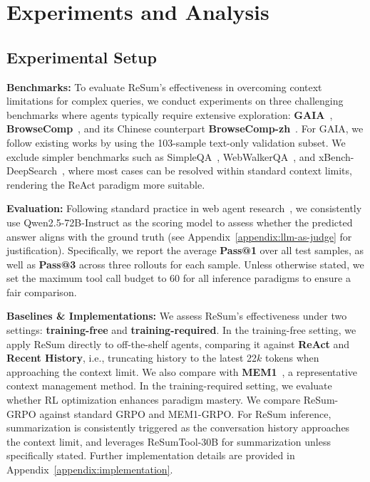 \section{Experiments and Analysis}

\subsection{Experimental Setup}
\textbf{Benchmarks:} To evaluate ReSum's effectiveness in overcoming context limitations for complex queries, we conduct experiments on three challenging benchmarks where agents typically require extensive exploration: \textbf{GAIA}~\citep{mialon2023gaia}, \textbf{BrowseComp}~\citep{bc_en}, and its Chinese counterpart \textbf{BrowseComp-zh}~\citep{bc_zh}. For GAIA, we follow existing works by using the 103-sample text-only validation subset. We exclude simpler benchmarks such as SimpleQA~\citep{wei2024simpleqa}, WebWalkerQA~\citep{wu2025webwalker}, and xBench-DeepSearch~\citep{xbench}, where most cases can be resolved within standard context limits, rendering the ReAct paradigm more suitable.

\textbf{Evaluation:} Following standard practice in web agent research~\citep{gao2025asearcher, dong2025arpo}, we consistently use Qwen2.5-72B-Instruct as the scoring model to assess whether the predicted answer aligns with the ground truth (see Appendix~\ref{appendix:llm-as-judge} for justification). Specifically, we report the average \textbf{Pass@1} over all test samples, as well as \textbf{Pass@3} across three rollouts for each sample. Unless otherwise stated, we set the maximum tool call budget to 60 for all inference paradigms to ensure a fair comparison.

\textbf{Baselines \& Implementations:} We assess ReSum's effectiveness under two settings: \textbf{training-free} and \textbf{training-required}. In the training-free setting, we apply ReSum directly to off-the-shelf agents, comparing it against \textbf{ReAct} and \textbf{Recent History}, i.e., truncating history to the latest 22$k$ tokens when approaching the context limit. We also compare with \textbf{MEM1}~\citep{zhou2025mem1}, a representative context management method. In the training-required setting, we evaluate whether RL optimization enhances paradigm mastery. We 
compare ReSum-GRPO against standard GRPO and MEM1-GRPO. For ReSum inference, summarization is consistently triggered as the conversation history approaches the context limit, and leverages ReSumTool-30B for summarization unless specifically stated. Further implementation details are provided in Appendix~\ref{appendix:implementation}.

